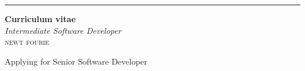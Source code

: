 \begin{titlepage} %
	
	\raggedleft %
	
	\rule{1pt}{\textheight} %
	\hspace{0.05\textwidth} %
	\parbox[b]{0.75\textwidth}{ %
		
		{\Huge\bfseries Curriculum vitae}\\[2\baselineskip] %
		{\large\textit{Intermediate Software Developer}}\\[4\baselineskip] %
		{\Large\textsc{newt fourie}} %
		
		\vspace{0.5\textheight} %
		
		{\noindent Applying for Senior Software Developer}\\[\baselineskip] %
	}

\end{titlepage}



